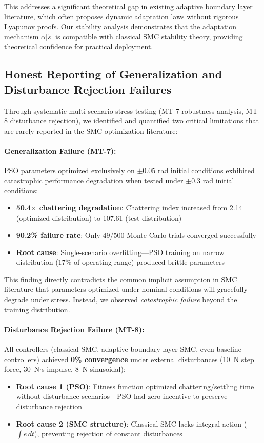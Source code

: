 This addresses a significant theoretical gap in existing adaptive boundary layer literature, which often proposes dynamic adaptation laws without rigorous Lyapunov proofs. Our stability analysis demonstrates that the adaptation mechanism $\alpha|\dot{s}|$ is compatible with classical SMC stability theory, providing theoretical confidence for practical deployment.

\subsection{Honest Reporting of Generalization and Disturbance Rejection Failures}
\label{subsec:contribution_negative_results}

Through systematic multi-scenario stress testing (MT-7 robustness analysis, MT-8 disturbance rejection), we identified and quantified two critical limitations that are rarely reported in the SMC optimization literature:

\paragraph{Generalization Failure (MT-7):}
PSO parameters optimized exclusively on $\pm0.05$ rad initial conditions exhibited catastrophic performance degradation when tested under $\pm0.3$ rad initial conditions:
\begin{itemize}
    \item \textbf{50.4$\times$ chattering degradation}: Chattering index increased from 2.14 (optimized distribution) to 107.61 (test distribution)
    \item \textbf{90.2\% failure rate}: Only 49/500 Monte Carlo trials converged successfully
    \item \textbf{Root cause}: Single-scenario overfitting—PSO training on narrow distribution (17\% of operating range) produced brittle parameters
\end{itemize}

This finding directly contradicts the common implicit assumption in SMC literature that parameters optimized under nominal conditions will gracefully degrade under stress. Instead, we observed \textit{catastrophic failure} beyond the training distribution.

\paragraph{Disturbance Rejection Failure (MT-8):}
All controllers (classical SMC, adaptive boundary layer SMC, even baseline controllers) achieved \textbf{0\% convergence} under external disturbances (10~N step force, 30~N$\cdot$s impulse, 8~N sinusoidal):
\begin{itemize}
    \item \textbf{Root cause 1 (PSO)}: Fitness function optimized chattering/settling time without disturbance scenarios—PSO had zero incentive to preserve disturbance rejection
    \item \textbf{Root cause 2 (SMC structure)}: Classical SMC lacks integral action ($\int e \, dt$), preventing rejection of constant disturbances
\end{itemize}

